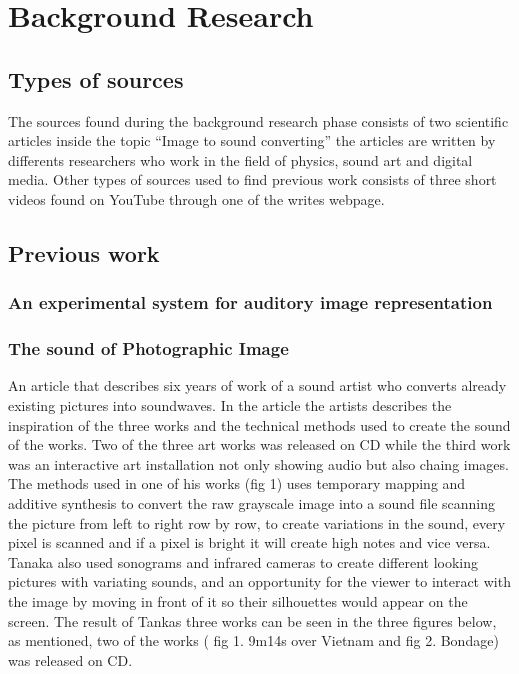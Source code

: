 \chapter{Background Research}\label{ch:bgresearch}



\section{Types of sources}\label{sec:typesofsources} 
The sources found during the background research phase consists of two scientific articles inside the topic “Image to sound converting” the articles are written by differents researchers who work in the field of physics, sound art and digital media. Other types of sources used to find previous work consists of three short videos found on YouTube through one of the writes webpage. 


\section{Previous work}\label{sec:previouswork}

\subsection{An experimental system for auditory image representation}\label{sec:experimentalsystem}



\subsection{The sound of Photographic Image}\label{sec:soundarticle}
An article that describes six years of work of a sound artist who converts already existing pictures into soundwaves. In the article the artists describes the inspiration of the three works and the technical methods used to create the sound of the works. Two of the three art works was released on CD while the third work was an interactive art installation not only showing audio but also chaing images. The methods used in one of his works (fig 1) uses temporary mapping and additive synthesis to convert the raw grayscale image into a sound file scanning the picture from left to right row by row, to create variations in the sound, every pixel is scanned and if a pixel is bright it will create high notes and vice versa.  Tanaka also used sonograms and infrared cameras to create different looking pictures with variating sounds, and an opportunity for the viewer to interact with the image by moving in front of it so their silhouettes would appear on the screen. The result of Tankas three works can be seen in the three figures below, as mentioned, two of the works ( fig 1. 9m14s over Vietnam and fig 2. Bondage) was released on CD.


